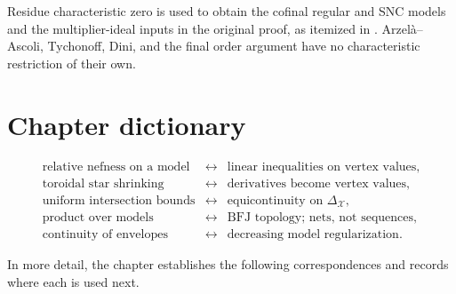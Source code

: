 Residue characteristic zero is used to obtain the cofinal regular and SNC
models and the multiplier-ideal inputs in the original proof, as itemized in
.  Arzel\`a--Ascoli, Tychonoff, Dini, and the final
order argument have no characteristic restriction of their own.

\section{Chapter dictionary}
\label{sec:ch22-dictionary}

\[
\begin{array}{ccl}
\text{relative nefness on a model}
 &\longleftrightarrow&
 \text{linear inequalities on vertex values},\\[1mm]
\text{toroidal star shrinking}
 &\longleftrightarrow&
 \text{derivatives become vertex values},\\[1mm]
\text{uniform intersection bounds}
 &\longleftrightarrow&
 \text{equicontinuity on }\Delta_{\mathcal X},\\[1mm]
\text{product over models}
 &\longleftrightarrow&
 \text{BFJ topology; nets, not sequences},\\[1mm]
\text{continuity of envelopes}
 &\longleftrightarrow&
 \text{decreasing model regularization}.
\end{array}
\]

In more detail, the chapter establishes the following correspondences and
records where each is used next.

